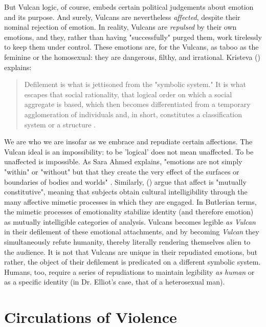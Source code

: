 \documentclass[letterpaper,12pt]{turabian-researchpaper}
\begin{document}
But Vulcan logic, of course, embeds certain political judgements about emotion and its purpose. And surely, Vulcans are nevertheless \textit{affected}, despite their nominal rejection of emotion. In reality, Vulcans are \textit{repulsed} by their own emotions, and they, rather than having "successfully" purged them, work tirelessly to keep them under control. These emotions are, for the Vulcans, as taboo as the feminine or the homosexual: they are dangerous, filthy, and irrational. Kristeva (\citeyear{kristeva_powers_1982}) explains:
\begin{quotation}
	\noindent Defilement is what is jettisoned from the "symbolic system." It is what escapes that social rationality, that logical order on which a social aggregate is based, which then becomes differentiated from a temporary agglomeration of individuals and, in short, constitutes a classification system or a structure \autocite[65]{kristeva_powers_1982}.
\end{quotation}
\noindent We are who we are insofar as we embrace and repudiate certain affections. The Vulcan ideal is an impossibility: to be 'logical' does not mean unaffected. To be unaffected is impossible. As Sara Ahmed explains, "emotions are not simply "within" or "without" but that they create the very effect of the surfaces or boundaries of bodies and worlds" \autocite[117]{ahmed_affective_2004}. Similarly, \citeauthor{richard_economies_2009} (\citeyear{richard_economies_2009}) argue that affect is "mutually constitutive", meaning that subjects obtain cultural intelligibility through the many affective mimetic processes in which they are engaged. In Butlerian terms, the mimetic processes of emotionality stabilize identity (and therefore emotion) as mutually intelligible categories of analysis. Vulcans becomes legible \textit{as Vulcan} in their defilement of these emotional attachments, and by becoming \textit{Vulcan} they simultaneously refute humanity, thereby literally rendering themselves alien to the audience. It is not that Vulcans are unique in their repudiated emotions, but rather, the object of their defilement is predicated on a different symbolic system. Humans, too, require a series of repudiations to maintain legibility \textit{as human} or as a specific identity (in Dr. Elliot's case, that of a heterosexual man).

\section{Circulations of Violence}
\end{document}
